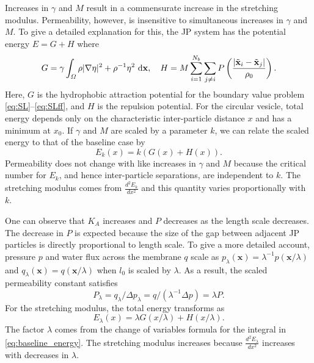 \documentclass[lineno]{jfm}
\newcommand{\xx}{\mathbf{x}}
\begin{document}
Increases in $\gamma$ and $M$ result in
a commensurate increase in the stretching modulus. 
Permeability, however, is insensitive to simultaneous increases in $\gamma$ and $M$.
To give a detailed explanation for this, the JP system has the potential energy $E = G + H$ where 
\begin{equation}
\label{eq:baseline_energy}
G = \gamma \int_{\Omega} \rho |\nabla \eta |^2 + \rho^{-1} \eta ^2 \,\dif\xx,\quad H = M \sum_{i=1}^{N_b}\sum_{j \neq i} 
       P\left(\frac{|\tilde{\xx}_i - \tilde{\xx}_j|}{\rho_0}\right).
\end{equation}
Here, $G$ is the hydrophobic attraction potential for the boundary value problem \eqref{eq:SL}--\eqref{eq:SLff},
and $H$ is the repulsion potential.  
For the circular vesicle, total energy depends only on the characteristic inter-particle distance $x$
and has a minimum at $x_0$. 
If $\gamma$ and $M$ are scaled by a parameter $k$, 
we can relate the scaled energy to that of the baseline case by 
\[E_k(x) = k(G(x) + H(x)).\]
Permeability does not change with like increases in $\gamma$ and $M$
because the critical number for $E_k$, and hence inter-particle separations, are independent to $k$.
The stretching modulus comes from $\frac{d^2E_k}{dx^2}$ and this 
quantity varies proportionally with $k$. 

One can observe that $K_A$ increases and $P$ decreases as the length scale decreases. 
The decrease in  $P$ is expected because 
the size of the gap between adjacent JP particles is directly proportional to length scale.
To give a more detailed account, pressure $p$ and water flux across the membrane $q$ scale as 
$p_{\lambda}(\mathbf{x}) = \lambda^{-1} p(\mathbf{x}/\lambda)$ and 
$q_{\lambda}(\mathbf{x}) = q(\mathbf{x}/\lambda)$ 
when $l_0$ is scaled by $\lambda$. As a result, the scaled permeability constant satisfies 
\[
P_{\lambda} = q_{\lambda}/\Delta p_{\lambda} = q/(\lambda^{-1} \Delta p) = \lambda P.
\]
For the stretching modulus, the total energy transforms as 
\[E_{\lambda}(x) = \lambda G(x/\lambda) + H(x/\lambda ).\]
The factor $\lambda$ comes from the change of 
variables formula for the integral in \eqref{eq:baseline_energy}.
The stretching modulus increases because $\frac{d^2E_{\lambda}}{dx^2}$ increases with decreases in $\lambda.$ 
\end{document}
